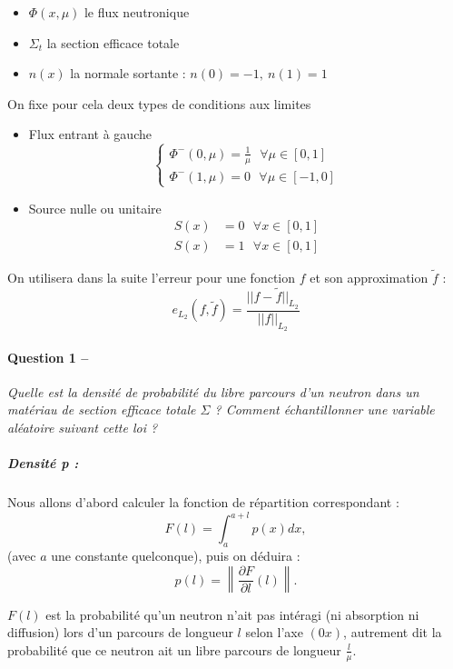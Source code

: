 \message{ !name(rapport_monte_carlo.tex)}\documentclass[12pt,a4paper]{article}
\newcommand{\norm}[1]{\big|\big|#1\big|\big|}
\newcommand{\question}[2]{\paragraph{Question #1 --}\hspace{-7pt}\textit{#2} \\}
\begin{document}
\begin{itemize}
\item $\Phi(x, \mu)$ le flux neutronique
\item $\Sigma_t$ la section efficace totale 
\item $n(x)$ la normale sortante : $n(0) = -1, ~ n(1) = 1$
\end{itemize}

On fixe pour cela deux types de conditions aux limites 
\begin{itemize}
\item Flux entrant à gauche
  \begin{equation}
    \begin{cases}
      \Phi^{-} (0, \mu) = \frac{1}{\mu}  ~~~ \forall \mu \in [0,1]\\
      \Phi^{-} (1, \mu) = 0 ~~~ \forall \mu \in [-1,0]
    \end{cases}
  \end{equation}
\item Source nulle ou unitaire
  \begin{align}
    S(x) &= 0 ~~~ \forall x \in [0,1] \\
    S(x) &= 1 ~~~ \forall x \in [0,1] 
  \end{align}
\end{itemize}	

On utilisera dans la suite l'erreur pour une fonction $f$ et son approximation $\tilde{f}$ : 
\begin{equation}
  e_{L_2}(f, \tilde{f}) = \frac{\norm{f-\tilde{f}}_{L_2}}{\norm{f}_{L_2}}
\end{equation}

\question{1}{Quelle est la densité de probabilité du libre parcours d'un neutron dans un matériau de section
  efficace totale $\Sigma$ ? Comment échantillonner une variable aléatoire suivant cette loi ?}
\subparagraph{Densité \textit{p} :} Nous allons d'abord calculer la fonction de répartition correspondant :
\begin{equation}
  F(l)=\int_a^{a+l} p(x) dx ,
\end{equation}
(avec $a$ une constante quelconque), puis on déduira :
\begin{equation}
  p(l)=\left\|\frac{\partial F}{\partial l}\left(l\right)\right\| .
\end{equation}

$F(l)$ est la probabilité qu'un neutron n'ait pas intéragi (ni absorption ni diffusion) lors d'un parcours de longueur $l$ selon l'axe $(0x)$, autrement dit la probabilité que ce neutron ait un libre parcours de longueur $\frac{l}{\mu}$.
\end{document}
